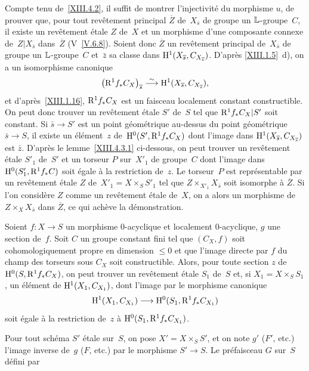 Compte tenu de~\ref{XIII.4.2}, il suffit de montrer l'injectivit\'e
du morphisme $u$, \ie de prouver que, pour tout rev\^etement
principal $\overline{Z}$ de~$X_{\bar{s}}$
de groupe un $\mathbb{L}$-groupe~$C$, il existe un rev\^etement \'etale
$Z$ de~$X$ et un morphisme d'une composante connexe de~$Z|X_{\bar{s}}$
dans~$\overline{Z}$ (V~\ref{V.6.8}). Soient donc $\overline{Z}$ un
rev\^etement principal de~$X_{\bar{s}}$ de groupe un $\mathbb{L}$-groupe~$C$ et~$\bar{z}$ sa classe dans
$\mathrm{H}^1(X_{\overline{s}},C_{X_{\overline{s}}})$. D'apr\`es \ref{XIII.1.5}~d), on
a un isomorphisme canonique
$$
\left(\mathrm{R}^1f_*C_X\right)_{\overline{s}}\overset{\sim}{\longrightarrow}\mathrm{H}^1(X_{\overline{s}},C_{X_{\overline{s}}}),
$$
et d'apr\`es~\ref{XIII.1.16}, $\mathrm{R}^1f_*C_X$ est un faisceau
localement constant constructible. On peut donc trouver un
rev\^etement \'etale $S'$ de~$S$ tel que $\mathrm{R}^1f_*C_X|S'$ soit
constant. Si $\bar{s}\to S'$ est un point g\'eom\'etrique
au-dessus du point g\'eom\'etrique $\bar{s}\to S$, il existe un
\'el\'ement~$z$ de~$\mathrm{H}^0(S', \mathrm{R}^1f_*C_X)$ dont l'image dans
$\mathrm{H}^1(X_{\overline{s}},C_{X_{\overline{s}}})$ est $\bar{z}$. D'apr\`es le
lemme~\ref{XIII.4.3.1} ci-dessous, on peut trouver un rev\^etement
\'etale $S'_1$ de~$S'$ et un torseur $P$ sur~$X'_1$ de groupe~$C$
dont l'image dans $\mathrm{H}^0(S'_1,\mathrm{R}^1f_*C)$ soit \'egale \`a la
restriction de~$z$. Le torseur~$P$ est repr\'esentable par un
rev\^etement \'etale $Z$ de~$X'_1=X\times_SS'_1$ tel que
$Z\times_{X'_1}X_{\bar{s}}$ soit isomorphe \`a $\overline{Z}$. Si
l'on consid\`ere $Z$ comme un rev\^etement \'etale de~$X$, on a
alors un morphisme de~$Z\times_XX_{\bar{s}}$ dans $\overline{Z}$, ce
qui ach\`eve la d\'emonstration.

\begin{sublemme}
\label{XIII.4.3.1}
Soient $f\colon X\to S$ un morphisme $0$-acyclique et localement
$0$-acyclique, $g$ une section de~$f$. Soit $C$ un groupe constant
fini tel que $(C_X,f)$ soit cohomologiquement propre en dimension
$\leqslant0$ et que l'image directe par $f$ du champ des torseurs sous
$C_X$ soit constructible. Alors, pour toute section $z$ de
$\mathrm{H}^0(S,\mathrm{R}^1f_*C_X)$, on peut trouver un rev\^etement \'etale
$S_1$ de~$S$ et, si $X_1=X\times_SS_1$, un \'el\'ement de
$\mathrm{H}^1(X_1,C_{X_1})$, dont l'image par le morphisme canonique
$$
\H^1(X_1,C_{X_1})\to\H^0(S_1,\R^1f_*C_{X_1})
$$
soit \'egale \`a la restriction de~$z$ \`a
$\mathrm{H}^0(S_1,\mathrm{R}^1f_*C_{X_1})$.
\end{sublemme}

Pour tout sch\'ema $S'$ \'etale sur~$S$, on pose $X'=X\times_SS'$,
et on note $g'$ (\resp $F'$, etc.) l'image inverse de~$g$ (\resp $F$,
etc.) par le morphisme
$S'\to S$. Le pr\'efaisceau $G$ sur~$S$ d\'efini par
 


